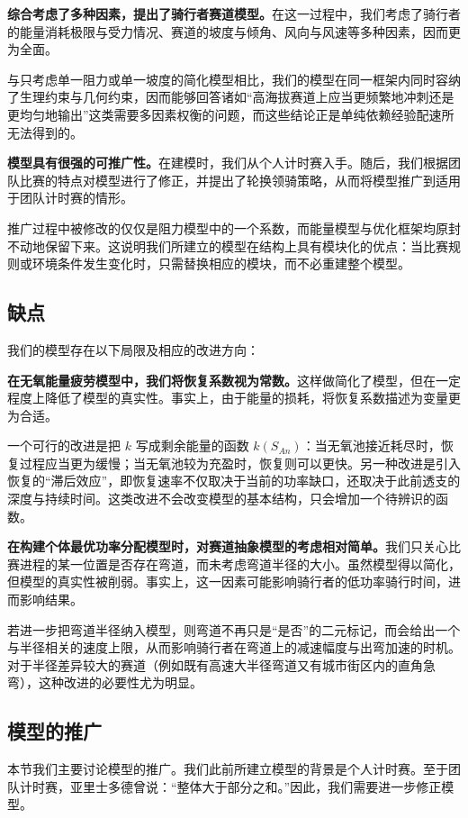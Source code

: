 \documentclass[11pt,a4paper]{ctexart}
\begin{document}
\textbf{综合考虑了多种因素，提出了骑行者赛道模型。}在这一过程中，我们考虑了骑行者的能量消耗极限与受力情况、赛道的坡度与倾角、风向与风速等多种因素，因而更为全面。

与只考虑单一阻力或单一坡度的简化模型相比，我们的模型在同一框架内同时容纳了生理约束与几何约束，因而能够回答诸如“高海拔赛道上应当更频繁地冲刺还是更均匀地输出”这类需要多因素权衡的问题，而这些结论正是单纯依赖经验配速所无法得到的。

\textbf{模型具有很强的可推广性。}在建模时，我们从个人计时赛入手。随后，我们根据团队比赛的特点对模型进行了修正，并提出了轮换领骑策略，从而将模型推广到适用于团队计时赛的情形。

推广过程中被修改的仅仅是阻力模型中的一个系数，而能量模型与优化框架均原封不动地保留下来。这说明我们所建立的模型在结构上具有模块化的优点：当比赛规则或环境条件发生变化时，只需替换相应的模块，而不必重建整个模型。

\subsection{缺点}

我们的模型存在以下局限及相应的改进方向：

\textbf{在无氧能量疲劳模型中，我们将恢复系数视为常数。}这样做简化了模型，但在一定程度上降低了模型的真实性。事实上，由于能量的损耗，将恢复系数描述为变量更为合适。

一个可行的改进是把 $k$ 写成剩余能量的函数 $k(S_{An})$：当无氧池接近耗尽时，恢复过程应当更为缓慢；当无氧池较为充盈时，恢复则可以更快。另一种改进是引入恢复的“滞后效应”，即恢复速率不仅取决于当前的功率缺口，还取决于此前透支的深度与持续时间。这类改进不会改变模型的基本结构，只会增加一个待辨识的函数。

\textbf{在构建个体最优功率分配模型时，对赛道抽象模型的考虑相对简单。}我们只关心比赛进程的某一位置是否存在弯道，而未考虑弯道半径的大小。虽然模型得以简化，但模型的真实性被削弱。事实上，这一因素可能影响骑行者的低功率骑行时间，进而影响结果。

若进一步把弯道半径纳入模型，则弯道不再只是“是否”的二元标记，而会给出一个与半径相关的速度上限，从而影响骑行者在弯道上的减速幅度与出弯加速的时机。对于半径差异较大的赛道（例如既有高速大半径弯道又有城市街区内的直角急弯），这种改进的必要性尤为明显。

\subsection{模型的推广}

本节我们主要讨论模型的推广。我们此前所建立模型的背景是个人计时赛。至于团队计时赛，亚里士多德曾说：“整体大于部分之和。”因此，我们需要进一步修正模型。
\end{document}
